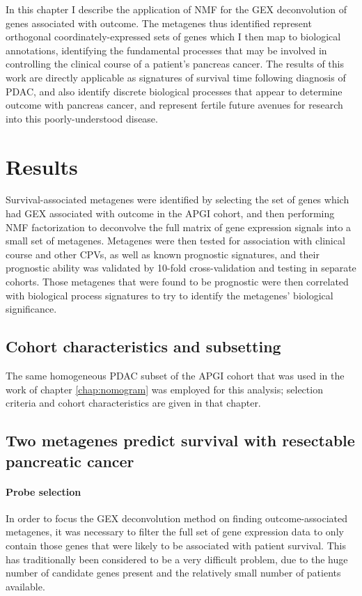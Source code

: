 \documentclass[dissertation.tex]{subfiles}
\begin{document}
In this chapter I describe the application of \gls{NMF} for the \gls{GEX} deconvolution of genes associated with outcome.  The metagenes thus identified represent orthogonal coordinately-expressed sets of genes which I then map to biological annotations, identifying the fundamental processes that may be involved in controlling the clinical course of a patient's pancreas cancer.  The results of this work are directly applicable as signatures of survival time following diagnosis of \gls{PDAC}, and also identify discrete biological processes that appear to determine outcome with pancreas cancer, and represent fertile future avenues for research into this poorly-understood disease.


\section{Results}

Survival-associated metagenes were identified by selecting the set of genes which had \gls{GEX} associated with outcome in the \gls{APGI} cohort, and then performing \gls{NMF} factorization to deconvolve the full matrix of gene expression signals into a small set of metagenes.  Metagenes were then tested for association with clinical course and other \glspl{CPV}, as well as known prognostic signatures, and their prognostic ability was validated by 10-fold cross-validation and testing in separate cohorts.  Those metagenes that were found to be prognostic were then correlated with biological process signatures to try to identify the metagenes' biological significance.

\subsection{Cohort characteristics and subsetting}
The same homogeneous \gls{PDAC} subset of the \gls{APGI} cohort that was used in the work of chapter \ref{chap:nomogram} was employed for this analysis; selection criteria and cohort characteristics are given in that chapter.  

\subsection{Two metagenes predict survival with resectable pancreatic cancer}
\paragraph{Probe selection}
In order to focus the \gls{GEX} deconvolution method on finding outcome-associated metagenes, it was necessary to filter the full set of gene expression data to only contain those genes that were likely to be associated with patient survival.  This has traditionally been considered to be a very difficult problem, due to the huge number of candidate genes present and the relatively small number of patients available.
\end{document}
